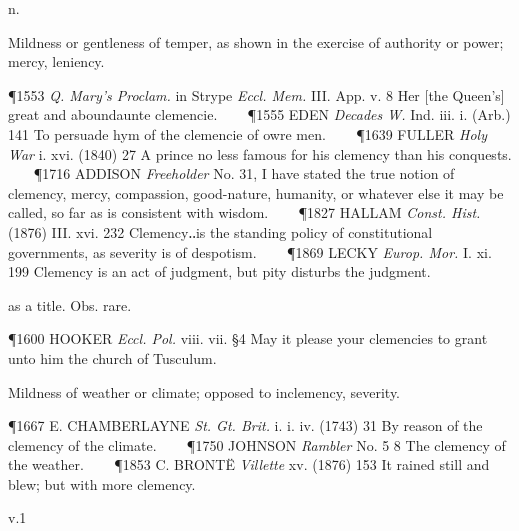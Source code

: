 \begin{description}[wide, labelwidth=!, labelindent=0pt]
 n.

\noindent {}

\vspace{-0.3cm}

\begin{myenumerate}

 Mildness or gentleness of temper, as shown in the exercise of authority or power; mercy, leniency.

\P 1553 \textit{Q. Mary's  Proclam.} in Strype \textit{Eccl. Mem.} III. App. v. 8 Her [the Queen's] great and aboundaunte clemencie.    
\P 1555 EDEN  \textit{Decades W.} Ind. iii. i. (Arb.) 141 To persuade hym of the clemencie of owre men.    
\P 1639 FULLER  \textit{Holy War} i. xvi. (1840) 27 A prince no less famous for his clemency than his conquests.    
\P 1716 ADDISON  \textit{Freeholder} No. 31, I have stated the true notion of clemency, mercy, compassion, good-nature, humanity, or whatever else it may be called, so far as is consistent with wisdom.    
\P 1827 HALLAM  \textit{Const. Hist.} (1876) III. xvi. 232 Clemency‥is the standing policy of constitutional governments, as severity is of despotism.    
\P 1869 LECKY  \textit{Europ. Mor.} I. xi. 199 Clemency is an act of judgment, but pity disturbs the judgment.

 as a title. Obs. rare.

\P 1600 HOOKER  \textit{Eccl. Pol.} viii. vii. §4 May it please your clemencies to grant unto him the church of Tusculum.

 Mildness of weather or climate; opposed to inclemency, severity.

\P 1667 E. CHAMBERLAYNE  \textit{St. Gt. Brit.} i. i. iv. (1743) 31 By reason of the clemency of the climate.    
\P 1750 JOHNSON  \textit{Rambler} No. 5 8 The clemency of the weather.    
\P 1853 C. BRONTË  \textit{Villette} xv. (1876) 153 It rained still and blew; but with more clemency.
\end{myenumerate}


 v.1

\noindent {}

\vspace{-0.3cm}


\end{description}
